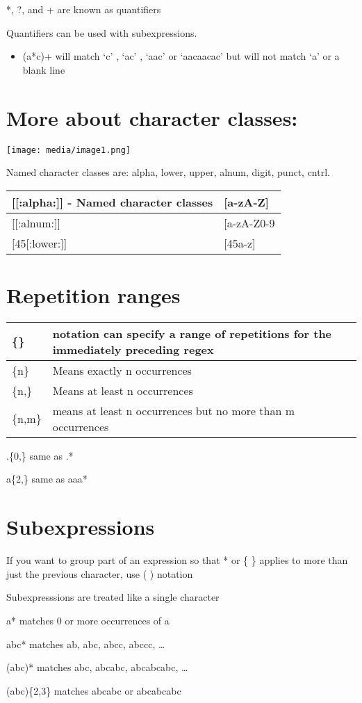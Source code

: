 *, ?, and + are known as quantifiers

Quantifiers can be used with subexpressions.

\begin{itemize}
\item
  (a*c)+ will match `c' , `ac' , `aac' or `aacaacac' but will not match
  `a' or a blank line
\end{itemize}

\hypertarget{more-about-character-classes}{%
\section{More about character
classes:}\label{more-about-character-classes}}

\texttt{[image: media/image1.png]}

Named character classes are: alpha, lower, upper, alnum, digit, punct,
cntrl.

\begin{longtable}[]{@{}ll@{}}
\toprule
{[}{[}:alpha:{]}{]} - Named character classes &
{[}a-zA-Z{]}\tabularnewline
\midrule
\endhead
{[}{[}:alnum:{]}{]} & {[}a-zA-Z0-9\tabularnewline
{[}45{[}:lower:{]}{]} & {[}45a-z{]}\tabularnewline
\bottomrule
\end{longtable}

\hypertarget{repetition-ranges}{%
\section{Repetition ranges}\label{repetition-ranges}}

\begin{longtable}[]{@{}ll@{}}
\toprule
\{\} & notation can specify a range of repetitions for the immediately
preceding regex\tabularnewline
\midrule
\endhead
\{n\} & Means exactly n occurrences\tabularnewline
\{n,\} & Means at least n occurrences\tabularnewline
\{n,m\} & means at least n occurrences but no more than m
occurrences\tabularnewline
\bottomrule
\end{longtable}

.\{0,\} same as .*

a\{2,\} same as aaa*

\hypertarget{subexpressions}{%
\section{Subexpressions}\label{subexpressions}}

If you want to group part of an expression so that * or \{ \} applies to
more than just the previous character, use ( ) notation

Subexpresssions are treated like a single character

a* matches 0 or more occurrences of a

abc* matches ab, abc, abcc, abccc, \ldots{}

(abc)* matches abc, abcabc, abcabcabc, \ldots{}

(abc)\{2,3\} matches abcabc or abcabcabc
